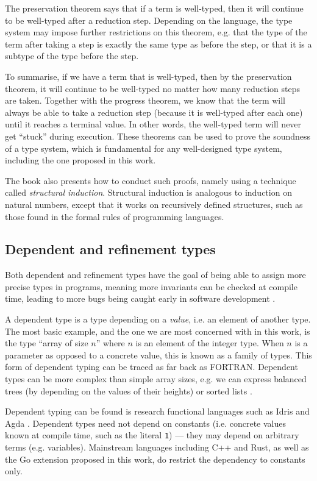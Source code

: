 The preservation theorem says that if a term is well-typed, then it will
continue to be well-typed after a reduction step. Depending on the language,
the type system may impose further restrictions on this theorem, e.g. that
the type of the term after taking a step is exactly the same type as before
the step, or that it is a subtype of the type before the step.

To summarise, if we have a term that is well-typed, then by the preservation
theorem, it will continue to be well-typed no matter how many reduction steps
are taken. Together with the progress theorem, we know that the term will always
be able to take a reduction step (because it is well-typed after each one) until
it reaches a terminal value. In other words, the well-typed term will never get
``stuck'' during execution. These theorems can be used to prove the soundness of
a type system, which is fundamental for any well-designed type system, including
the one proposed in this work.

The book also presents how to conduct such proofs, namely using a technique
called \emph{structural induction}. Structural induction is analogous to
induction on natural numbers, except that it works on recursively defined
structures, such as those found in the formal rules of programming languages.

\subsection{Dependent and refinement types}

Both dependent and refinement types have the goal of being able to assign more
precise types in programs, meaning more invariants can be checked at compile
time, leading to more bugs being caught early in software development
\autocites{dependentPractical}{refinement}.

A dependent type is a type depending on a \emph{value}, i.e. an element of
another type. The most basic example, and the one we are most concerned with in
this work, is the type ``array of size $n$'' where $n$ is an element of the
integer type. When $n$ is a parameter as opposed to a concrete value, this is
known as a family of types. This form of dependent typing can be traced as far
back as FORTRAN. Dependent types can be more complex than simple array sizes,
e.g. we can express balanced trees (by depending on the values of their heights)
or sorted lists \autocite{dependentAtWork}.

Dependent typing can be found is research functional languages such as Idris and
Agda \autocites{idris}{agda}. Dependent types need not depend on constants (i.e.
concrete values known at compile time, such as the literal \texttt{1}) --- they
may depend on arbitrary terms (e.g. variables). Mainstream languages including
C++ and Rust, as well as the Go extension proposed in this work, do restrict the
dependency to constants only.


